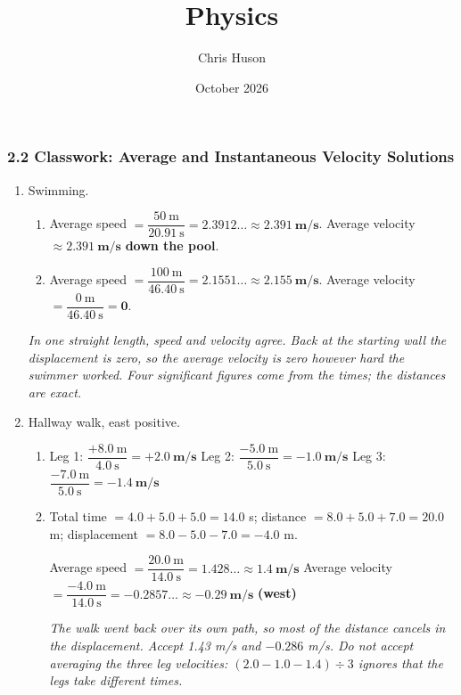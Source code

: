 \documentclass[12pt, twoside]{article}
\title{Physics}
\author{Chris Huson}
\date{October 2026}
\begin{document}
\subsubsection*{2.2 Classwork: Average and Instantaneous Velocity Solutions}

\begin{enumerate}[itemsep=0.4cm]

\item Swimming.
  \begin{enumerate}[itemsep=0.2cm]
    \item Average speed $= \dfrac{50~\text{m}}{20.91~\text{s}} = 2.3912\ldots
      \approx \mathbf{2.391~\textbf{m/s}}$. \quad Average velocity
      $\approx \mathbf{2.391~\textbf{m/s}}$ \textbf{down the pool}.
    \item Average speed $= \dfrac{100~\text{m}}{46.40~\text{s}} = 2.1551\ldots
      \approx \mathbf{2.155~\textbf{m/s}}$. \quad Average velocity
      $= \dfrac{0~\text{m}}{46.40~\text{s}} = \mathbf{0}$.
  \end{enumerate}
  \emph{In one straight length, speed and velocity agree. Back at the starting wall the
  displacement is zero, so the average velocity is zero however hard the swimmer
  worked. Four significant figures come from the times; the distances are exact.}

\item Hallway walk, east positive.
  \begin{enumerate}[itemsep=0.2cm]
    \item Leg 1: $\dfrac{+8.0~\text{m}}{4.0~\text{s}} = \mathbf{+2.0~\textbf{m/s}}$
      \quad Leg 2: $\dfrac{-5.0~\text{m}}{5.0~\text{s}} = \mathbf{-1.0~\textbf{m/s}}$
      \quad Leg 3: $\dfrac{-7.0~\text{m}}{5.0~\text{s}} = \mathbf{-1.4~\textbf{m/s}}$
    \item Total time $= 4.0 + 5.0 + 5.0 = 14.0$ s; distance $= 8.0 + 5.0 + 7.0 = 20.0$ m;
      displacement $= 8.0 - 5.0 - 7.0 = -4.0$ m.

      Average speed $= \dfrac{20.0~\text{m}}{14.0~\text{s}} = 1.428\ldots
      \approx \mathbf{1.4~\textbf{m/s}}$ \quad
      Average velocity $= \dfrac{-4.0~\text{m}}{14.0~\text{s}} = -0.2857\ldots
      \approx \mathbf{-0.29~\textbf{m/s}}$ \textbf{(west)}

      \emph{The walk went back over its own path, so most of the distance cancels in
      the displacement. Accept 1.43 m/s and $-0.286$ m/s. Do not accept averaging the
      three leg velocities: $(2.0 - 1.0 - 1.4) \div 3$ ignores that the legs take
      different times.}
  \end{enumerate}


\end{enumerate}
\end{document}
